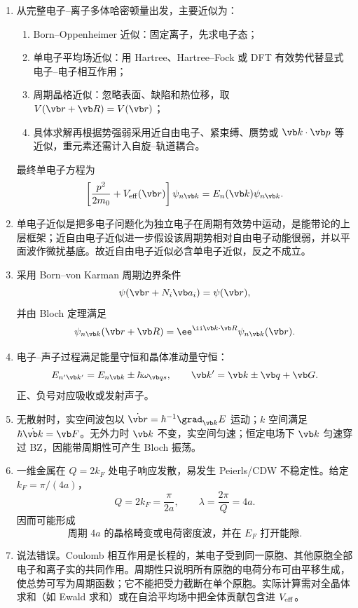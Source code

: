 \begin{question}[20 分]
\begin{solution}
\begin{enumerate}
  \item 从完整电子--离子多体哈密顿量出发，主要近似为：
  \begin{enumerate}
    \item Born--Oppenheimer 近似：固定离子，先求电子态；
    \item 单电子平均场近似：用 Hartree、Hartree--Fock 或 DFT 有效势代替显式电子--电子相互作用；
    \item 周期晶格近似：忽略表面、缺陷和热位移，取 $V(\vb r+\vb R)=V(\vb r)$；
    \item 具体求解再根据势强弱采用近自由电子、紧束缚、赝势或 $\vb k\cdot\vb p$ 等近似，重元素还需计入自旋--轨道耦合。
  \end{enumerate}
  最终单电子方程为
  \[
    \left[\frac{p^2}{2m_0}+V_{\rm eff}(\vb r)\right]
    \psi_{n\vb k}=E_n(\vb k)\psi_{n\vb k}.
  \]
  \item 单电子近似是把多电子问题化为独立电子在周期有效势中运动，是能带论的上层框架；近自由电子近似进一步假设该周期势相对自由电子动能很弱，并以平面波作微扰基底。故近自由电子近似必含单电子近似，反之不成立。
  \item 采用 Born--von Karman 周期边界条件
  \[
    \psi(\vb r+N_i\vb a_i)=\psi(\vb r),
  \]
  并由 Bloch 定理满足
  \[
    \psi_{n\vb k}(\vb r+\vb R)=
    \ee^{\ii\vb k\cdot\vb R}\psi_{n\vb k}(\vb r).
  \]
  \item 电子--声子过程满足能量守恒和晶体准动量守恒：
  \[
    E_{n'\vb k'}=E_{n\vb k}\pm\hbar\omega_{\vb q s},
    \qquad
    \vb k'=\vb k\pm\vb q+\vb G.
  \]
  正、负号对应吸收或发射声子。
  \item 无散射时，实空间波包以
  $\dot{\vb r}=\hbar^{-1}\grad_{\vb k}E$ 运动；$k$ 空间满足
  $\hbar\dot{\vb k}=\vb F$。无外力时 $\vb k$ 不变，实空间匀速；恒定电场下 $\vb k$ 匀速穿过 BZ，因能带周期性可产生 Bloch 振荡。
  \item 一维金属在 $Q=2k_F$ 处电子响应发散，易发生 Peierls/CDW 不稳定性。给定
  $k_F=\pi/(4a)$，
  \[
    Q=2k_F=\frac\pi{2a},
    \qquad
    \lambda=\frac{2\pi}{Q}=4a.
  \]
  因而可能形成
  \[
    \boxed{\text{周期 }4a\text{ 的晶格畸变或电荷密度波，并在 }E_F\text{ 打开能隙}.}
  \]
  \item 说法错误。Coulomb 相互作用是长程的，某电子受到同一原胞、其他原胞全部电子和离子实的共同作用。周期性只说明所有原胞的电荷分布可由平移生成，使总势可写为周期函数；它不能把受力截断在单个原胞。实际计算需对全晶体求和（如 Ewald 求和）或在自洽平均场中把全体贡献包含进 $V_{\rm eff}$。
\end{enumerate}
\end{solution}
\end{question}

